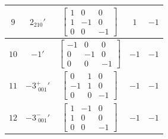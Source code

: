 \documentclass[fleqn,8pt]{jsarticle}
\begin{document}
\begin{longtable}{ccccc}
$ 9 $ & $ 2{}_{210}{}' $ & $ \begin{bmatrix} 1 & 0 & 0 \\ 1 & -1 & 0 \\ 0 & 0 & -1 \end{bmatrix} $ & $ 1 $ & $ -1 $ \\ \hline
$ 10 $ & $ -1{}' $ & $ \begin{bmatrix} -1 & 0 & 0 \\ 0 & -1 & 0 \\ 0 & 0 & -1 \end{bmatrix} $ & $ -1 $ & $ -1 $ \\ \hline
$ 11 $ & $ -3^{+}_{\,\,001}{}' $ & $ \begin{bmatrix} 0 & 1 & 0 \\ -1 & 1 & 0 \\ 0 & 0 & -1 \end{bmatrix} $ & $ -1 $ & $ -1 $ \\ \hline
$ 12 $ & $ -3^{-}_{\,\,001}{}' $ & $ \begin{bmatrix} 1 & -1 & 0 \\ 1 & 0 & 0 \\ 0 & 0 & -1 \end{bmatrix} $ & $ -1 $ & $ -1 $ \\
\end{longtable}
\end{document}
